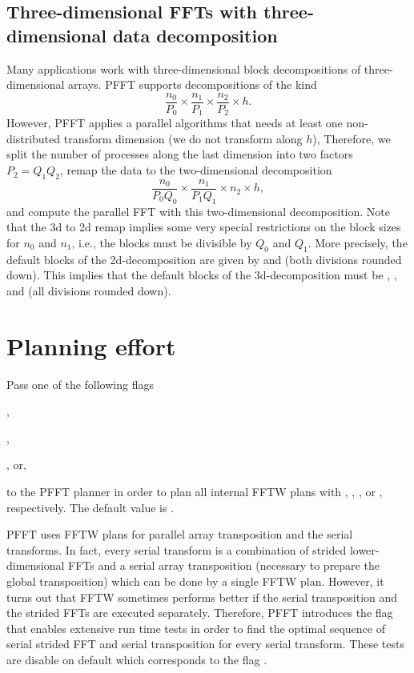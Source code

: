 \subsection{Three-dimensional FFTs with three-dimensional data decomposition}\label{sec:3don3d}
Many applications work with three-dimensional block decompositions of three-dimensional arrays.
PFFT supports decompositions of the kind
\begin{equation*}
  \frac{n_0}{P_0} \times \frac{n_1}{P_1} \times \frac{n_2}{P_2} \times h.
\end{equation*}
However, PFFT applies a parallel algorithms that needs at least one non-distributed transform dimension (we do not transform along $h$),
Therefore, we split the number of processes along the last dimension into two factors $P_2=Q_1Q_2$, remap
the data to the two-dimensional decomposition
\begin{equation*}
  \frac{n_0}{P_0Q_0} \times \frac{n_1}{P_1Q_1} \times n_2 \times h,
\end{equation*}
and compute the parallel FFT with this two-dimensional decomposition.
Note that the 3d to 2d remap implies some very special restrictions on the block sizes for $n_0$ and $n_1$, i.e.,
the blocks must be divisible by $Q_0$ and $Q_1$. More precisely, the default blocks of the 2d-decomposition
are given by  and  (both divisions rounded down).
This implies that the default blocks of the 3d-decomposition must be ,
, and  (all divisions rounded down).


\section{Planning effort}
Pass one of the following flags
\begin{compactitem}
  \item {},
  \item {},
  \item {}, or,
  \item {}
\end{compactitem}
to the PFFT planner in order to plan all internal FFTW plans with , , , or ,
respectively. The default value is .

PFFT uses FFTW plans for parallel array transposition and the serial transforms. In fact, every serial transform is a combination of
strided lower-dimensional FFTs and a serial array transposition (necessary to prepare the global transposition) which can be done by a single FFTW plan.
However, it turns out that FFTW sometimes performs better if the serial transposition and the strided FFTs are executed separately.
Therefore, PFFT introduces the flag  that enables extensive run time tests in order to find the optimal sequence of
serial strided FFT and serial transposition for every serial transform. These tests are disable on default which corresponds to the flag .


